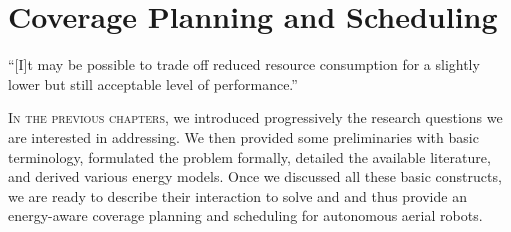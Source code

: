 
%
%
%
%
\chapter{Coverage Planning and Scheduling}
\label{cp:dyn}

\begin{chapquote}{\cite{lahijanian2018resource}}
  ``[I]t may be possible to trade off reduced resource consumption for a slightly lower but still acceptable level of performance.''
\end{chapquote}

\vspace*{1em}

\lettrine{I}{n the previous chapters}, we introduced progressively the research questions we are interested in addressing. We then provided some preliminaries with basic terminology, formulated the problem formally, detailed the available literature, and derived various energy models. Once we discussed all these basic constructs, we are ready to describe their interaction to solve  and  and thus provide an energy-aware coverage planning and scheduling for autonomous aerial robots.

